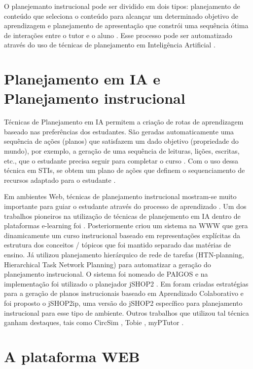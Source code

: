 \documentclass[
12pt,				%
oneside,			%
a4paper,			%
english,			%
brazil				%
]{abntex2ppgsi}
\begin{document}
O planejemanto instrucional pode ser dividido em dois tipos: planejamento de conteúdo que seleciona o conteúdo para alcançar um determinado objetivo de aprendizagem \cite{vassileva1996} e planejamento de apresentação que constrói uma sequência ótima de interações entre o tutor e o aluno \cite{mohan2003}. Esse processo pode ser automatizado através do uso de técnicas de planejamento em Inteligência Artificial \cite{cho2000, vassileva1996, brusilovsky2003, garrido2008}.

\section{Planejamento em IA e Planejamento instrucional}

Técnicas de Planejamento em IA permitem a criação de rotas de aprendizagem baseado nas preferências dos estudantes. São geradas automaticamente uma sequência de ações (planos) que satisfazem um dado objetivo (propriedade do mundo), por exemplo, a geração de uma sequência de leituras, lições, escritas, etc., que o estudante precisa seguir para completar o curso \cite{castillo2010}. Com o uso dessa técnica em STIs, se obtem um plano de ações que definem o sequenciamento de recursos adaptado para o estudante \cite{challco2012}.

Em ambientes Web, técnicas de planejamento instrucional mostram-se muito importante para guiar o estudante através do processo de aprendizado \cite{pinto2013}. Um dos trabalhos pioneiros na utilização de técnicas de planejemento em IA dentro de plataformas e-learning foi \cite{peachey1986}. Posteriormente  criou um sistema na WWW que gera dinamicamente um curso instrucional baseado em representações explícitas da estrutura dos conceitos / tópicos que foi mantido separado das matérias de ensino. Já  utilizou planejamento hierárquico de rede de tarefas (HTN-planning, Hierarchical Task Network Planning) para automatizar a geração do planejamento instrucional. O sistema foi nomeado de PAIGOS e na implementação foi utilizado o planejador jSHOP2 \cite{nau2003}. Em  foram criadas estratégias para a geração de planos instrucionais baseado em Aprendizado Colaborativo e foi proposto o jSHOP2ip, uma versão do jSHOP2 específico para planejamento instrucional para esse tipo de ambiente. Outros trabalhos que utilizou tal técnica ganham destaques, tais como CircSim \cite{cho1999}, Tobie \cite{vassileva1996}, myPTutor \cite{garrido2012}.

\section{A plataforma WEB}
\end{document}
